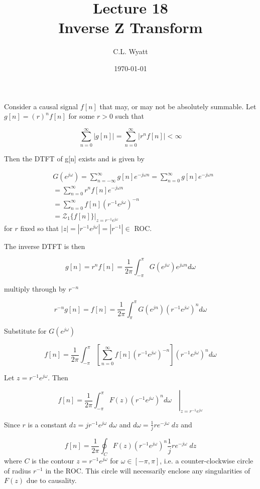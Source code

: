 \documentclass{article}
\begin{document}
\title{Lecture 18\\Inverse Z Transform}
\author{C.L. Wyatt}
\date{\today}
\maketitle

Consider a causal signal $f[n]$ that may, or may not be absolutely summable. Let $g[n]=(r)^{n} f[n]$ for some $r>0$ such that

$$
\sum_{n=0}^{\infty}|g[n]|=\sum_{n=0}^{\infty}\left|r^{n} f[n]\right|<\infty
$$

Then the DTFT of g[n] exists and is given by

$$
\begin{aligned}
& G\left(e^{j \omega}\right)=\sum_{n=-\infty}^{\infty} g[n] e^{-j \omega n}=\sum_{n=0}^{\infty} g[n] e^{-j \omega n} \\
&=\sum_{n=0}^{\infty} r^{n} f[n] e^{-j \omega n} \\
&=\sum_{n=0}^{\infty} f[n]\left(r^{-1} e^{j \omega}\right)^{-n} \\
&=\left.\mathcal{Z}_{1}\{f[n]\}\right|_{z=r^{-1} e^{j \omega}} 
\end{aligned}
$$
for $r$ fixed so that $|z| = |r^{-1} e^{j\omega}| = |r^{-1}| \in$ ROC.

The inverse DTFT is then

$$
g[n]=r^{n} f[n]=\frac{1}{2 \pi} \int_{-\pi}^{\pi} G\left(e^{j \omega}\right) e^{j \omega n} d \omega
$$

multiply through by $r^{-n}$

$$
r^{-n} g[n]=f[n]=\frac{1}{2 \pi} \int_{\pi}^{\pi} G\left(e^{j n}\right)\left(r^{-1} e^{j \omega}\right)^{n} d \omega
$$

Substitute for $G\left(e^{j \omega}\right)$

$$
f[n]=\frac{1}{2 \pi} \int_{-\pi}^{\pi} \left[ \sum_{n=0}^{\infty} f[n]\left(r^{-1} e^{j \omega}\right)^{-n} \right] \left(r^{-1} e^{j \omega}\right)^{n} d \omega
$$

Let $z=r^{-1}e^{j\omega}$. Then

$$
f[n]=\left. \frac{1}{2 \pi} \int_{-\pi}^{\pi} F(z) \left(r^{-1} e^{j \omega}\right)^{n} d \omega \quad \right|_{z=r^{-1}e^{j\omega}}
$$

Since $r$ is a constant $dz=jr^{-1}e^{j\omega}\; d\omega$ and $d\omega = \frac{1}{j} re^{-j\omega}\; dz$ and

$$
f[n]=\frac{1}{2 \pi} \oint_C F(z) \left(r^{-1} e^{j \omega}\right)^{n} \frac{1}{j} re^{-j\omega}\; dz
$$
where $C$ is the contour $z=r^{-1}e^{j\omega}$ for $\omega\in[-\pi, \pi]$, i.e. a counter-clockwise circle of radius $r^{-1}$ in the ROC. This circle will necessarily enclose any singularities of $F(z)$ due to causality.
\end{document}

